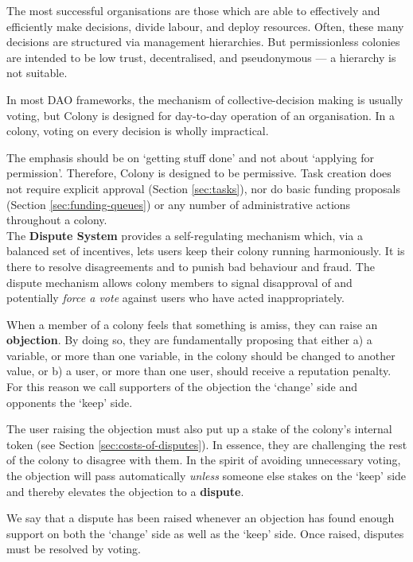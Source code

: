The most successful organisations are those which are able to effectively and efficiently make decisions, divide labour, and deploy resources. Often, these many decisions are structured via management hierarchies. But permissionless colonies are intended to be low trust, decentralised, and pseudonymous --- a hierarchy is not suitable.

In most DAO frameworks, the mechanism of collective-decision making is usually voting, but Colony is designed for day-to-day operation of an organisation. In a colony, voting on every decision is wholly impractical.

The emphasis should be on `getting stuff done' and not about `applying for permission'. Therefore, Colony is designed to be permissive. Task creation does not require explicit approval (Section \ref{sec:tasks}), nor do basic funding proposals (Section \ref{sec:funding-queues}) or any number of administrative actions throughout a colony. \\

The \textbf{Dispute System} provides a self-regulating mechanism which, via a balanced set of incentives, lets users keep their colony running harmoniously. It is there to resolve disagreements and to punish bad behaviour and fraud. The dispute mechanism allows colony members to signal disapproval of and potentially \textit{force a vote} against users who have acted inappropriately.

When a member of a colony feels that something is amiss, they can raise an \textbf{objection}. By doing so, they are fundamentally proposing that either a) a variable, or more than one variable, in the colony should be changed to another value, or b) a user, or more than one user, should receive a reputation penalty. For this reason we call supporters of the objection the `change' side and opponents the `keep' side.

The user raising the objection must also put up a stake of the colony's internal token (see Section \ref{sec:costs-of-disputes}). In essence, they are challenging the rest of the colony to disagree with them. In the spirit of avoiding unnecessary voting, the objection will pass automatically \emph{unless} someone else stakes on the `keep' side and thereby elevates the objection to a \textbf{dispute}.

We say that a dispute has been raised whenever an objection has found enough support on both the `change' side as well as the `keep' side. Once raised, disputes must be resolved by voting.

